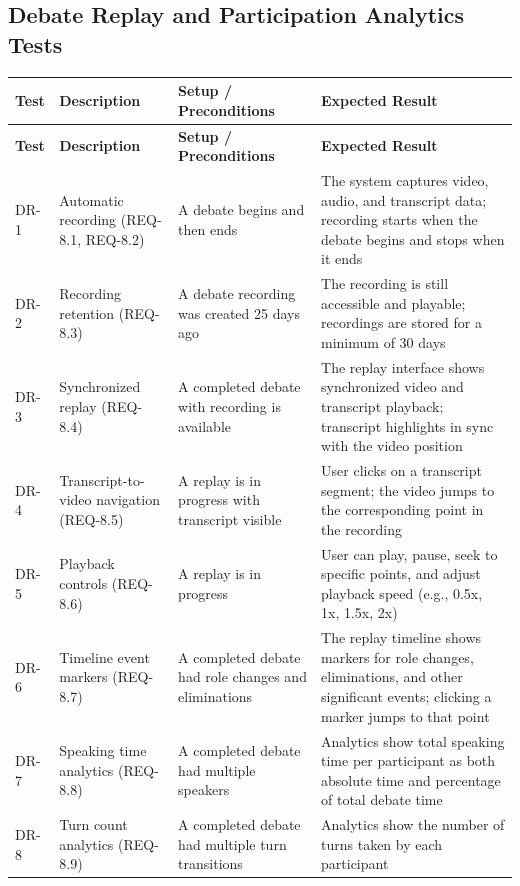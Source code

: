 \documentclass[12pt]{article}
\begin{document}
\subsection{Debate Replay and Participation Analytics Tests}

\begin{longtable}{|p{1.5cm}|p{3cm}|p{4cm}|p{4cm}|}
\hline
\textbf{Test} & \textbf{Description} & \textbf{Setup / Preconditions} & \textbf{Expected Result} \\
\hline
\endfirsthead
\hline
\textbf{Test} & \textbf{Description} & \textbf{Setup / Preconditions} & \textbf{Expected Result} \\
\hline
\endhead
DR-1 & Automatic recording (REQ-8.1, REQ-8.2) & A debate begins and then ends & The system captures video, audio, and transcript data; recording starts when the debate begins and stops when it ends \\
\hline
DR-2 & Recording retention (REQ-8.3) & A debate recording was created 25 days ago & The recording is still accessible and playable; recordings are stored for a minimum of 30 days \\
\hline
DR-3 & Synchronized replay (REQ-8.4) & A completed debate with recording is available & The replay interface shows synchronized video and transcript playback; transcript highlights in sync with the video position \\
\hline
DR-4 & Transcript-to-video navigation (REQ-8.5) & A replay is in progress with transcript visible & User clicks on a transcript segment; the video jumps to the corresponding point in the recording \\
\hline
DR-5 & Playback controls (REQ-8.6) & A replay is in progress & User can play, pause, seek to specific points, and adjust playback speed (e.g., 0.5x, 1x, 1.5x, 2x) \\
\hline
DR-6 & Timeline event markers (REQ-8.7) & A completed debate had role changes and eliminations & The replay timeline shows markers for role changes, eliminations, and other significant events; clicking a marker jumps to that point \\
\hline
DR-7 & Speaking time analytics (REQ-8.8) & A completed debate had multiple speakers & Analytics show total speaking time per participant as both absolute time and percentage of total debate time \\
\hline
DR-8 & Turn count analytics (REQ-8.9) & A completed debate had multiple turn transitions & Analytics show the number of turns taken by each participant \\

\end{longtable}
\end{document}
